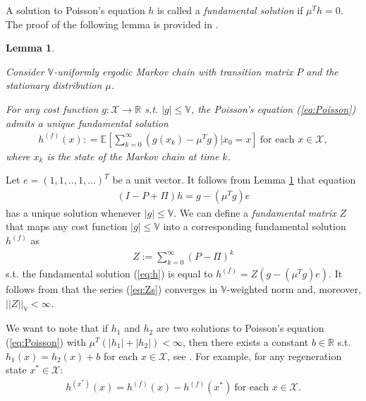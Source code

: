 \documentclass[11pt]{article}
\newcommand{\R}{\mathbb{R}}
\newcommand{\E}{\mathbb{E}}
\newcommand{\X}{\mathcal{X}}
\newcommand{\V}{\mathbb{V}}
\newtheorem{lemma}{Lemma}
\theoremstyle{definition}
\numberwithin{equation}{section}
\begin{document}
A solution to Poisson's equation $h$ is called a \textit{fundamental solution} if   $ \mu^T h =0.$    The proof of the following lemma is provided in \cite[Proposition A.3.11]{Meyn2007}.



\begin{lemma}\label{lem:poisson_sol}

Consider $\V$-uniformly ergodic  Markov chain with transition matrix $P$ and the stationary  distribution $\mu$.

 For any cost function $g:\X \rightarrow \R$ s.t. $|g|\leq \V$, the Poisson's equation (\ref{eq:Poisson}) admits a unique fundamental solution 
\begin{align}\label{eq:h}
h^{(f)}(x) : = \E \left[\sum\limits_{k=0}^\infty \left(g(x_k) - \mu^Tg\right)|x_0 = x\right] ~\text{for each }x\in \X,
\end{align}
where $x_k$ is the state of the Markov chain at time $k$.


\end{lemma}

Let $e = (1, 1,.., 1, ...)^T$ be a unit vector. It follows from Lemma \ref{lem:poisson_sol} that   equation  \begin{align*}(I-P+\Pi) h = g -(\mu^T g) e\end{align*}  has a unique solution whenever $|g|\leq \V$.  We can define a \textit{fundamental matrix} $Z$ that maps any cost function $|g|\leq \V$ into a corresponding fundamental solution $h^{(f)}$ as
 \begin{align}\label{eq:Zs}Z :=\sum\limits_{k=0}^\infty \left( P-\Pi \right)^k \end{align} 
s.t. the fundamental solution  (\ref{eq:h}) is equal to $h^{(f)} = Z\left(g -(\mu^T g) e\right).$ It follows from  \cite[Theorem 16.1.2]{Meyn2009} that the series (\ref{eq:Zs}) converges in $\V$-weighted norm and, moreover,  $||Z||_\V<\infty$.

We want to note that if $h_1$ and $h_2$ are two solutions to Poisson's equation (\ref{eq:Poisson}) with $\mu^T(|h_1|+|h_2|)<\infty$, then there exists a constant $b\in \R$ s.t. $h_1(x) = h_2(x) +b$ for each $x\in \X$, see \cite[Proposition 17.4.1]{Meyn2009}. For example, for any regeneration state $x^*\in \X$:
\begin{align}\label{eq:hh}
h^{(x^*)}(x) = h^{(f)}(x) -  h^{(f)}(x^*) ~\text{for each }x\in \X.
\end{align}
\end{document}
